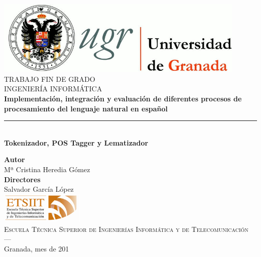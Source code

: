 \begin{titlepage}
 
\newlength{\centeroffset}
\setlength{\centeroffset}{-0.5\oddsidemargin}
\addtolength{\centeroffset}{0.5\evensidemargin}
\thispagestyle{empty}

\noindent\hspace*{\centeroffset}%

\centering
\includegraphics[width=0.9\textwidth]{imagenes/logo_ugr.jpg}\\[1.4cm]

\textsc{ \Large TRABAJO FIN DE GRADO\\[0.2cm]}
\textsc{ INGENIERÍA INFORMÁTICA}\\[1cm]
% 
{\Large\bfseries Implementación, integración y evaluación de diferentes procesos de procesamiento del lenguaje natural en español\\
}
\noindent\rule[-1ex]{\textwidth}{3pt}\\[3.5ex]
{\large\bfseries Tokenizador, POS Tagger y Lematizador}

\vspace{2.5cm}
\noindent\hspace*{\centeroffset}%
\centering

\textbf{Autor}\\ {Mª Cristina Heredia Gómez}\\[2.5ex]
\textbf{Directores}\\
{Salvador García López}\\[2cm]
\includegraphics[width=0.3\textwidth]{imagenes/etsiit_logo.png}\\[0.1cm]
\textsc{Escuela Técnica Superior de Ingenierías Informática y de Telecomunicación}\\
\textsc{---}\\
Granada, mes de 201
\end{titlepage}




